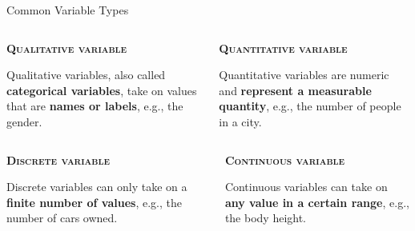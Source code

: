 \documentclass[main.tex]{subfiles}
\begin{document}
    \begin{frame}{Common Variable Types}
        \begin{columns}
            \begin{column}[t]{.45\textwidth}
                \begin{justify}
                    \alert{\textbf{\textsc{Qualitative variable}}}
                    
                    Qualitative variables, also called \textbf{categorical variables}, take on values that are \textbf{names or labels}, e.g., the gender.
                \end{justify}
            \end{column}
            \begin{column}[t]{.45\textwidth}
                \begin{justify}
                    \alert{\textbf{\textsc{Quantitative variable}}}
                    
                    Quantitative variables are numeric and \textbf{represent a measurable quantity}, e.g., the number of people in a city.
                \end{justify}
            \end{column}
        \end{columns}
    
        \begin{columns}
            \begin{column}[t]{.45\textwidth}
                \begin{justify}
                    \alert{\textbf{\textsc{Discrete variable}}}
                    
                    Discrete variables can only take on a \textbf{finite number of values}, e.g., the number of cars owned.
                \end{justify}
            \end{column}
            \begin{column}[t]{.45\textwidth}
                \begin{justify}
                    \alert{\textbf{\textsc{Continuous variable}}}
                    
                    Continuous variables can take on \textbf{any value in a certain range}, e.g., the body height.
                \end{justify}
            \end{column}
        \end{columns}
    \end{frame}
\end{document}
